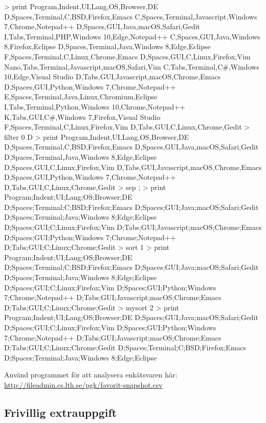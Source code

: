 \begin{REPLnonum}
> print
Program,Indent,UI,Lang,OS,Browser,DE
D,Spaces,Terminal,C,BSD,Firefox,Emacs
C,Spaces,Terminal,Javascript,Windows 7,Chrome,Notepad++
D,Spaces,GUI,Java,macOS,Safari,Gedit
I,Tabs,Terminal,PHP,Windows 10,Edge,Notepad++
C,Spaces,GUI,Java,Windows 8,Firefox,Eclipse
D,Spaces,Terminal,Java,Windows 8,Edge,Eclipse
F,Spaces,Terminal,C,Linux,Chrome,Emacs
D,Spaces,GUI,C,Linux,Firefox,Vim
Nano,Tabs,Terminal,Javascript,macOS,Safari,Vim
C,Tabs,Terminal,C#,Windows 10,Edge,Visual Studio
D,Tabs,GUI,Javascript,macOS,Chrome,Emacs
D,Spaces,GUI,Python,Windows 7,Chrome,Notepad++
E,Spaces,Terminal,Java,Linux,Chromium,Eclipse
I,Tabs,Terminal,Python,Windows 10,Chrome,Notepad++
K,Tabs,GUI,C#,Windows 7,Firefox,Visual Studio
F,Spaces,Terminal,C,Linux,Firefox,Vim
D,Tabs,GUI,C,Linux,Chrome,Gedit
> filter 0 D
> print
Program,Indent,UI,Lang,OS,Browser,DE
D,Spaces,Terminal,C,BSD,Firefox,Emacs
D,Spaces,GUI,Java,macOS,Safari,Gedit
D,Spaces,Terminal,Java,Windows 8,Edge,Eclipse
D,Spaces,GUI,C,Linux,Firefox,Vim
D,Tabs,GUI,Javascript,macOS,Chrome,Emacs
D,Spaces,GUI,Python,Windows 7,Chrome,Notepad++
D,Tabs,GUI,C,Linux,Chrome,Gedit
> sep ;
> print
Program;Indent;UI;Lang;OS;Browser;DE
D;Spaces;Terminal;C;BSD;Firefox;Emacs
D;Spaces;GUI;Java;macOS;Safari;Gedit
D;Spaces;Terminal;Java;Windows 8;Edge;Eclipse
D;Spaces;GUI;C;Linux;Firefox;Vim
D;Tabs;GUI;Javascript;macOS;Chrome;Emacs
D;Spaces;GUI;Python;Windows 7;Chrome;Notepad++
D;Tabs;GUI;C;Linux;Chrome;Gedit
> sort 1
> print
Program;Indent;UI;Lang;OS;Browser;DE
D;Spaces;Terminal;C;BSD;Firefox;Emacs
D;Spaces;GUI;Java;macOS;Safari;Gedit
D;Spaces;Terminal;Java;Windows 8;Edge;Eclipse
D;Spaces;GUI;C;Linux;Firefox;Vim
D;Spaces;GUI;Python;Windows 7;Chrome;Notepad++
D;Tabs;GUI;Javascript;macOS;Chrome;Emacs
D;Tabs;GUI;C;Linux;Chrome;Gedit
> mysort 2
> print
Program;Indent;UI;Lang;OS;Browser;DE
D;Spaces;GUI;Java;macOS;Safari;Gedit
D;Spaces;GUI;C;Linux;Firefox;Vim
D;Spaces;GUI;Python;Windows 7;Chrome;Notepad++
D;Tabs;GUI;Javascript;macOS;Chrome;Emacs
D;Tabs;GUI;C;Linux;Chrome;Gedit
D;Spaces;Terminal;C;BSD;Firefox;Emacs
D;Spaces;Terminal;Java;Windows 8;Edge;Eclipse
\end{REPLnonum}

\Task Använd programmet för att analysera enkätsvaren här:\\  \url{http://fileadmin.cs.lth.se/pgk/favorit-snapshot.csv}

\clearpage

\subsection{Frivillig extrauppgift}

